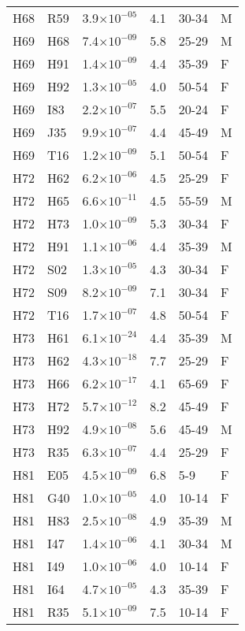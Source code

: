 \begin{longtable}{lllrll}
   H68 & R59 & 3.9$\times10^{-05}$ & 4.1 & 30-34 & M \\ 
   H69 & H68 & 7.4$\times10^{-09}$ & 5.8 & 25-29 & M \\ 
   H69 & H91 & 1.4$\times10^{-09}$ & 4.4 & 35-39 & F \\ 
   H69 & H92 & 1.3$\times10^{-05}$ & 4.0 & 50-54 & F \\ 
   H69 & I83 & 2.2$\times10^{-07}$ & 5.5 & 20-24 & F \\ 
   H69 & J35 & 9.9$\times10^{-07}$ & 4.4 & 45-49 & M \\ 
   H69 & T16 & 1.2$\times10^{-09}$ & 5.1 & 50-54 & F \\ 
   H72 & H62 & 6.2$\times10^{-06}$ & 4.5 & 25-29 & F \\ 
   H72 & H65 & 6.6$\times10^{-11}$ & 4.5 & 55-59 & M \\ 
   H72 & H73 & 1.0$\times10^{-09}$ & 5.3 & 30-34 & F \\ 
   H72 & H91 & 1.1$\times10^{-06}$ & 4.4 & 35-39 & M \\ 
   H72 & S02 & 1.3$\times10^{-05}$ & 4.3 & 30-34 & F \\ 
   H72 & S09 & 8.2$\times10^{-09}$ & 7.1 & 30-34 & F \\ 
   H72 & T16 & 1.7$\times10^{-07}$ & 4.8 & 50-54 & F \\ 
   H73 & H61 & 6.1$\times10^{-24}$ & 4.4 & 35-39 & M \\ 
   H73 & H62 & 4.3$\times10^{-18}$ & 7.7 & 25-29 & F \\ 
   H73 & H66 & 6.2$\times10^{-17}$ & 4.1 & 65-69 & F \\ 
   H73 & H72 & 5.7$\times10^{-12}$ & 8.2 & 45-49 & F \\ 
   H73 & H92 & 4.9$\times10^{-08}$ & 5.6 & 45-49 & M \\ 
   H73 & R35 & 6.3$\times10^{-07}$ & 4.4 & 25-29 & F \\ 
   H81 & E05 & 4.5$\times10^{-09}$ & 6.8 & 5-9 & F \\ 
   H81 & G40 & 1.0$\times10^{-05}$ & 4.0 & 10-14 & F \\ 
   H81 & H83 & 2.5$\times10^{-08}$ & 4.9 & 35-39 & M \\ 
   H81 & I47 & 1.4$\times10^{-06}$ & 4.1 & 30-34 & M \\ 
   H81 & I49 & 1.0$\times10^{-06}$ & 4.0 & 10-14 & F \\ 
   H81 & I64 & 4.7$\times10^{-05}$ & 4.3 & 35-39 & F \\ 
   H81 & R35 & 5.1$\times10^{-09}$ & 7.5 & 10-14 & F \\ 

\end{longtable}
